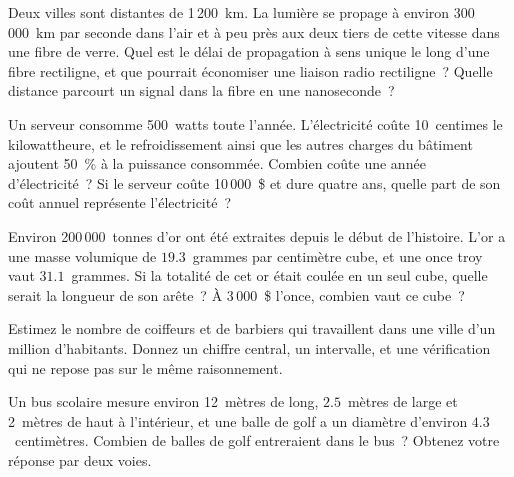 \begin{question}\label{iq:iv1:estimation:5}
Deux villes sont distantes de 1\,200~km. La lumière se propage à environ 300\,000~km par seconde dans l'air et à peu près aux deux tiers de cette vitesse dans une fibre de verre. Quel est le délai de propagation à sens unique le long d'une fibre rectiligne, et que pourrait économiser une liaison radio rectiligne~? Quelle distance parcourt un signal dans la fibre en une nanoseconde~?
\end{question}

\begin{question}\label{iq:iv1:estimation:6}
Un serveur consomme 500~watts toute l'année. L'électricité coûte 10~centimes le kilowattheure, et le refroidissement ainsi que les autres charges du bâtiment ajoutent 50~\% à la puissance consommée. Combien coûte une année d'électricité~? Si le serveur coûte 10\,000~\$ et dure quatre ans, quelle part de son coût annuel représente l'électricité~?
\end{question}

\begin{question}\label{iq:iv1:estimation:7}
Environ 200\,000~tonnes d'or ont été extraites depuis le début de l'histoire. L'or a une masse volumique de $19.3$~grammes par centimètre cube, et une once troy vaut $31.1$~grammes. Si la totalité de cet or était coulée en un seul cube, quelle serait la longueur de son arête~? À 3\,000~\$ l'once, combien vaut ce cube~?
\end{question}

\begin{question}\label{iq:iv1:estimation:8}
Estimez le nombre de coiffeurs et de barbiers qui travaillent dans une ville d'un million d'habitants. Donnez un chiffre central, un intervalle, et une vérification qui ne repose pas sur le même raisonnement.
\end{question}

\begin{question}\label{iq:iv1:estimation:9}
Un bus scolaire mesure environ 12~mètres de long, $2.5$~mètres de large et 2~mètres de haut à l'intérieur, et une balle de golf a un diamètre d'environ $4.3$~centimètres. Combien de balles de golf entreraient dans le bus~? Obtenez votre réponse par deux voies.
\end{question}

